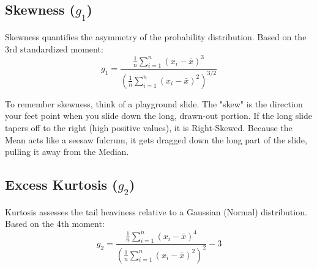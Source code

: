 \documentclass[11pt, a4paper]{article}
\begin{document}
\subsection*{Skewness ($g_1$)}
Skewness quantifies the asymmetry of the probability distribution. Based on the 3rd standardized moment:
\[ g_1 = \frac{\frac{1}{n} \sum_{i=1}^{n} (x_i - \bar{x})^3}{\left( \frac{1}{n} \sum_{i=1}^{n} (x_i - \bar{x})^2 \right)^{3/2}} \]

\vspace{0.2cm}
\begin{center}
\end{center}

\begin{tcolorbox}[profbox, title=Imagine: The Playground Slide]
To remember skewness, think of a playground slide. The "skew" is the direction your feet point when you slide down the long, drawn-out portion. If the long slide tapers off to the right (high positive values), it is Right-Skewed. Because the Mean acts like a seesaw fulcrum, it gets dragged down the long part of the slide, pulling it away from the Median.
\end{tcolorbox}

\subsection*{Excess Kurtosis ($g_2$)}
Kurtosis assesses the tail heaviness relative to a Gaussian (Normal) distribution. Based on the 4th moment:
\[ g_2 = \frac{\frac{1}{n} \sum_{i=1}^{n} (x_i - \bar{x})^4}{\left( \frac{1}{n} \sum_{i=1}^{n} (x_i - \bar{x})^2 \right)^2} - 3 \]
\end{document}
